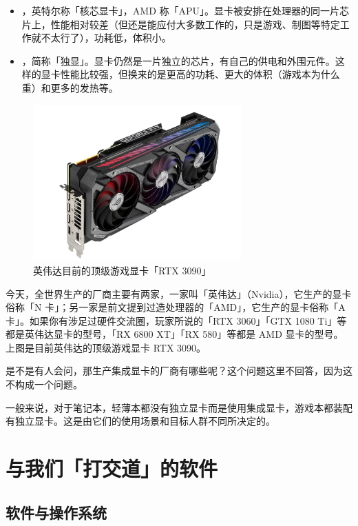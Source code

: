 \begin{itemize}
  \item {}，英特尔称「核芯显卡」，AMD 称「APU」。显卡被安排在处理器的同一片芯片上，性能相对较差（但还是能应付大多数工作的，只是游戏、制图等特定工作就不太行了），功耗低，体积小。
  \item {}，简称「独显」。显卡仍然是一片独立的芯片，有自己的供电和外围元件。这样的显卡性能比较强，但换来的是更高的功耗、更大的体积（游戏本为什么重）和更多的发热等。
\end{itemize}

\begin{figure}[H]
  \centering
  \includegraphics[width=8cm]{assets/3090.png}
  \caption{英伟达目前的顶级游戏显卡「RTX 3090」}
  \label{3090-gpu}
\end{figure}

今天，全世界生产的厂商主要有两家，一家叫「英伟达」（Nvidia），它生产的显卡俗称「N 卡」；另一家是前文提到过造处理器的「AMD」，它生产的显卡俗称「A 卡」。如果你有涉足过硬件交流圈，玩家所说的「RTX 3060」「GTX 1080 Ti」等都是英伟达显卡的型号，「RX 6800 XT」「RX 580」等都是 AMD 显卡的型号。上图是目前英伟达的顶级游戏显卡 RTX 3090。

\begin{note}
  是不是有人会问，那生产集成显卡的厂商有哪些呢？这个问题这里不回答，因为这不构成一个问题。
\end{note}


一般来说，对于笔记本，轻薄本都没有独立显卡而是使用集成显卡，游戏本都装配有独立显卡。这是由它们的使用场景和目标人群不同所决定的。

\section{与我们「打交道」的软件}

\subsection{软件与操作系统}

